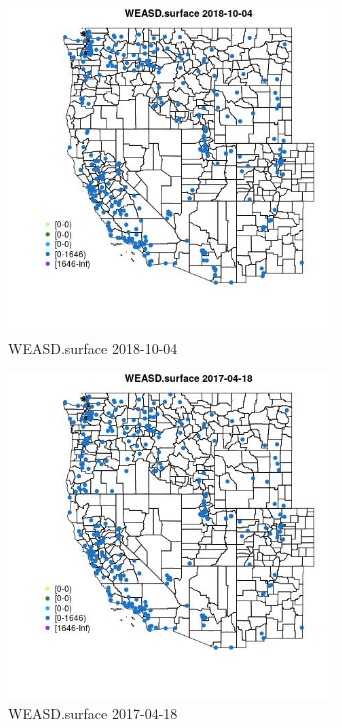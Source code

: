 \begin{figure} 
\centering  
\includegraphics[width=0.77\textwidth]{Code_Outputs/Report_ML_input_PM25_Step4_part_f_de_duplicated_aves_prioritize_24hr_obswNAs_MapObsWEASDsurface2018-10-04.jpg} 
\caption{\label{fig:Report_ML_input_PM25_Step4_part_f_de_duplicated_aves_prioritize_24hr_obswNAsMapObsWEASDsurface2018-10-04}WEASD.surface 2018-10-04} 
\end{figure} 
 

\begin{figure} 
\centering  
\includegraphics[width=0.77\textwidth]{Code_Outputs/Report_ML_input_PM25_Step4_part_f_de_duplicated_aves_prioritize_24hr_obswNAs_MapObsWEASDsurface2017-04-18.jpg} 
\caption{\label{fig:Report_ML_input_PM25_Step4_part_f_de_duplicated_aves_prioritize_24hr_obswNAsMapObsWEASDsurface2017-04-18}WEASD.surface 2017-04-18} 
\end{figure} 
 

